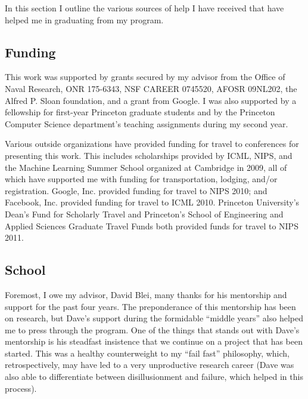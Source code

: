 In this section I outline the various sources of help I have received
that have helped me in graduating from my program.

\subsection*{Funding}
This work was supported by grants secured by my advisor from the
Office of Naval Research, ONR 175-6343, NSF CAREER 0745520, AFOSR
09NL202, the Alfred P. Sloan foundation, and a grant from Google.  I
was also supported by a fellowship for first-year Princeton graduate
students and by the Princeton Computer Science department's teaching
assignments during my second year.

Various outside organizations have provided funding for travel to
conferences for presenting this work.  This includes scholarships
provided by ICML, NIPS, and the Machine Learning Summer School
organized at Cambridge in 2009, all of which have supported me with
funding for transportation, lodging, and/or registration.  Google,
Inc. provided funding for travel to NIPS 2010; and Facebook,
Inc. provided funding for travel to ICML 2010.  Princeton University's
Dean's Fund for Scholarly Travel and Princeton's School of Engineering
and Applied Sciences Graduate Travel Funds both provided funds for
travel to NIPS 2011.

\subsection*{School}
Foremost, I owe my advisor, David Blei, many thanks for his mentorship
and support for the past four years.  The preponderance of this
mentorship has been on research, but Dave's support during the
formidable ``middle years'' also helped me to press through the
program.  One of the things that stands out with Dave's mentorship is
his steadfast insistence that we continue on a project that has been
started.  This was a healthy counterweight to my ``fail fast''
philosophy, which, retrospectively, may have led to a very
unproductive research career (Dave was also able to differentiate
between disillusionment and failure, which helped in this process).

